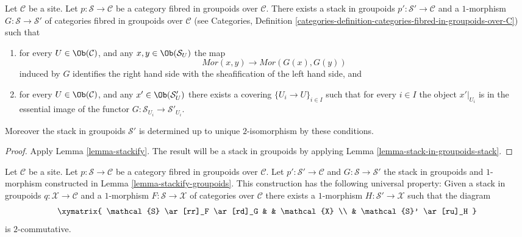 \begin{lemma}
\label{lemma-stackify-groupoids}
Let $\mathcal{C}$ be a site.
Let $p : \mathcal{S} \to \mathcal{C}$ be a category
fibred in groupoids over $\mathcal{C}$.
There exists a stack in groupoids
$p' : \mathcal{S}' \to \mathcal{C}$ and a
$1$-morphism $G : \mathcal{S} \to \mathcal{S}'$
of categories fibred in groupoids over $\mathcal{C}$ (see
Categories, Definition
\ref{categories-definition-categories-fibred-in-groupoids-over-C})
such that
\begin{enumerate}
\item for every $U \in \Ob(\mathcal{C})$, and any
$x, y \in \Ob(\mathcal{S}_U)$ the map
$$
\mathit{Mor}(x, y) \longrightarrow \mathit{Mor}(G(x), G(y))
$$
induced by $G$ identifies the right hand side with the sheafification
of the left hand side, and
\item for every $U \in \Ob(\mathcal{C})$, and any
$x' \in \Ob(\mathcal{S}'_U)$ there exists a covering
$\{U_i \to U\}_{i \in I}$ such that for every $i \in I$ the
object $x'|_{U_i}$ is in the essential image of the
functor $G : \mathcal{S}_{U_i} \to \mathcal{S}'_{U_i}$.
\end{enumerate}
Moreover the stack in groupoids $\mathcal{S}'$ is determined up to unique
$2$-isomorphism by these conditions.
\end{lemma}

\begin{proof}
Apply Lemma \ref{lemma-stackify}. The result will be a
stack in groupoids by applying Lemma \ref{lemma-stack-in-groupoids-stack}.
\end{proof}

\begin{lemma}
\label{lemma-stackify-groupoids-universal-property}
Let $\mathcal{C}$ be a site.
Let $p : \mathcal{S} \to \mathcal{C}$ be a category fibred in groupoids
over $\mathcal{C}$. Let $p' : \mathcal{S}' \to \mathcal{C}$ and
$G : \mathcal{S} \to \mathcal{S}'$
the stack in groupoids and $1$-morphism constructed in
Lemma \ref{lemma-stackify-groupoids}.
This construction has the following universal property: Given a stack
in groupoids $q : \mathcal{X} \to \mathcal{C}$ and a $1$-morphism
$F : \mathcal{S} \to \mathcal{X}$ of categories over $\mathcal{C}$
there exists a $1$-morphism $H : \mathcal{S}' \to \mathcal{X}$
such that the diagram
$$
\xymatrix{
\mathcal{S} \ar[rr]_F \ar[rd]_G & & \mathcal{X} \\
& \mathcal{S}' \ar[ru]_H
}
$$
is $2$-commutative.
\end{lemma}

